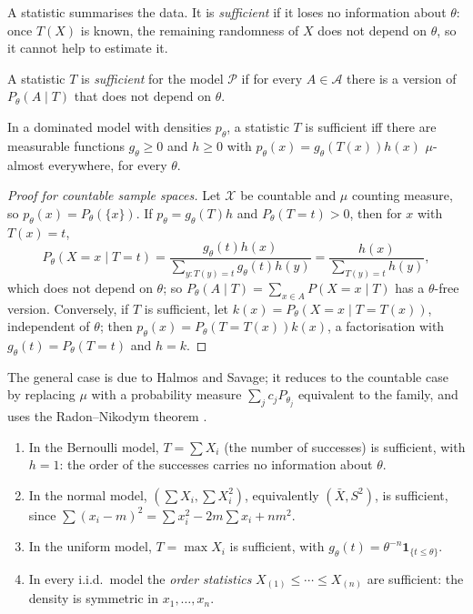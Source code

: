 A statistic summarises the data. It is \emph{sufficient} if it loses no information about $\theta$: once $T(X)$ is known, the remaining randomness of $X$ does not depend on $\theta$, so it cannot help to estimate it.

\begin{definition}\label{statistics:definition-sufficient}
A statistic $T$ is \emph{sufficient} for the model $\mathcal{P}$ if for every $A \in \mathcal{A}$ there is a version of $P_\theta(A \mid T)$ that does not depend on $\theta$.
\end{definition}

\begin{theorem}\label{statistics:theorem-factorisation}
In a dominated model with densities $p_\theta$, a statistic $T$ is sufficient iff there are measurable functions $g_\theta \geq 0$ and $h \geq 0$ with $p_\theta(x) = g_\theta(T(x))h(x)$ $\mu$-almost everywhere, for every $\theta$.
\end{theorem}

\begin{proof}[Proof for countable sample spaces]
Let $\mathcal{X}$ be countable and $\mu$ counting measure, so $p_\theta(x) = P_\theta(\{x\})$. If $p_\theta = g_\theta(T)h$ and $P_\theta(T = t) > 0$, then for $x$ with $T(x) = t$,
\[
P_\theta(X = x \mid T = t) = \frac{g_\theta(t)h(x)}{\sum_{y : T(y) = t}g_\theta(t)h(y)} = \frac{h(x)}{\sum_{T(y) = t}h(y)},
\]
which does not depend on $\theta$; so $P_\theta(A \mid T) = \sum_{x \in A}P(X = x \mid T)$ has a $\theta$-free version. Conversely, if $T$ is sufficient, let $k(x) = P_\theta(X = x \mid T = T(x))$, independent of $\theta$; then
$p_\theta(x) = P_\theta(T = T(x))k(x)$, a factorisation with $g_\theta(t) = P_\theta(T = t)$ and $h = k$.
\end{proof}

The general case is due to Halmos and Savage; it reduces to the countable case by replacing $\mu$ with a probability measure $\sum_jc_jP_{\theta_j}$ equivalent to the family, and uses the Radon--Nikodym theorem
\cite{lehmann-casella}.

\begin{example}\label{statistics:example-sufficient}
\begin{enumerate}
\item In the Bernoulli model, $T = \sum X_i$ (the number of successes) is sufficient, with $h = 1$: the order of the successes carries no information about $\theta$.
\item In the normal model, $(\sum X_i, \sum X_i^2)$, equivalently $(\bar X, S^2)$, is sufficient, since $\sum(x_i - m)^2 = \sum x_i^2 - 2m\sum x_i + nm^2$.
\item In the uniform model, $T = \max X_i$ is sufficient, with $g_\theta(t) = \theta^{-n}\mathbf{1}_{\{t \leq \theta\}}$.
\item In every i.i.d.\ model the \emph{order statistics} $X_{(1)} \leq \cdots \leq X_{(n)}$ are sufficient: the density is symmetric in $x_1, \ldots, x_n$.
\end{enumerate}
\end{example}

